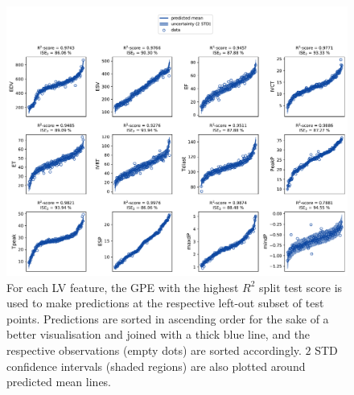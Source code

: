 \begin{figure}[!ht]
    \myfloatalign
    \includegraphics[width=\textwidth]{figures/chapter04/bgpes_vs_bsplit_sham.pdf}
    \caption{For each LV feature, the GPE with the highest $R^2$ split test score is used to make predictions at the respective left-out subset of test points. Predictions are sorted in ascending order for the sake of a better visualisation and joined with a thick blue line, and the respective observations (empty dots) are sorted accordingly. $2$ STD confidence intervals (shaded regions) are also plotted around predicted mean lines.}
    \label{fig:gpesexampleinferencesham}
\end{figure}

